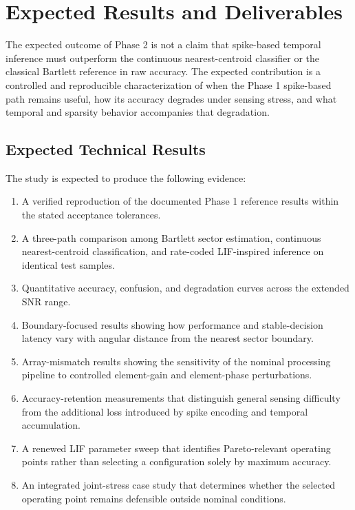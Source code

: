 \section{Expected Results and Deliverables}

The expected outcome of Phase 2 is not a claim that spike-based temporal inference must outperform the continuous nearest-centroid classifier or the classical Bartlett reference in raw accuracy. The expected contribution is a controlled and reproducible characterization of when the Phase 1 spike-based path remains useful, how its accuracy degrades under sensing stress, and what temporal and sparsity behavior accompanies that degradation.

\subsection{Expected Technical Results}

The study is expected to produce the following evidence:

\begin{enumerate}
    \item A verified reproduction of the documented Phase 1 reference results within the stated acceptance tolerances.
    \item A three-path comparison among Bartlett sector estimation, continuous nearest-centroid classification, and rate-coded LIF-inspired inference on identical test samples.
    \item Quantitative accuracy, confusion, and degradation curves across the extended SNR range.
    \item Boundary-focused results showing how performance and stable-decision latency vary with angular distance from the nearest sector boundary.
    \item Array-mismatch results showing the sensitivity of the nominal processing pipeline to controlled element-gain and element-phase perturbations.
    \item Accuracy-retention measurements that distinguish general sensing difficulty from the additional loss introduced by spike encoding and temporal accumulation.
    \item A renewed LIF parameter sweep that identifies Pareto-relevant operating points rather than selecting a configuration solely by maximum accuracy.
    \item An integrated joint-stress case study that determines whether the selected operating point remains defensible outside nominal conditions.
\end{enumerate}

